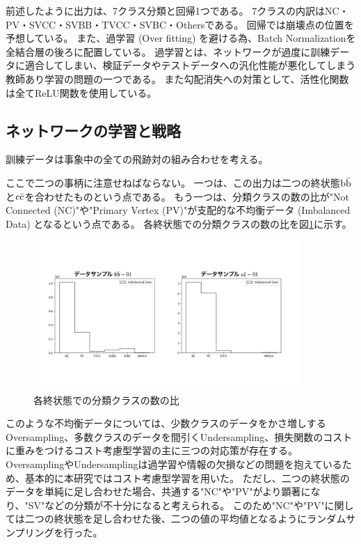 前述したように出力は、7クラス分類と回帰1つである。
7クラスの内訳はNC・PV・SVCC・SVBB・TVCC・SVBC・Othersである。
回帰では崩壊点の位置を予想している。
また、過学習 (Over fitting) を避ける為、Batch Normalization\cite{BatchNormalizationpaper}を全結合層の後ろに配置している。
過学習とは、ネットワークが過度に訓練データに適合してしまい、検証データやテストデータへの汎化性能が悪化してしまう教師あり学習の問題の一つである。
また勾配消失への対策として、活性化関数は全てReLU関数を使用している。


\subsection{ネットワークの学習と戦略} \label{Net:PM:TrainingandStrategyofPM}

訓練データは事象中の全ての飛跡対の組み合わせを考える。

ここで二つの事柄に注意せねばならない。
一つは、この出力は二つの終状態$\rm b\bar{b}$と$\rm c\bar{c}$を合わせたものという点である。
もう一つは、分類クラスの数の比が"Not Connected (NC)"や"Primary Vertex (PV)"が支配的な不均衡データ (Imbalanced Data) となるという点である。
各終状態での分類クラスの数の比を図\ref{3-3-2-1ImbalancedData}に示す。

\begin{figure}[htbp]
 \centering
 \includegraphics[trim = 100 200 100 150, width=0.9\textwidth, clip]{Figure/3Networks/3-3-2-1ImbalancedData.png}
 \caption{各終状態での分類クラスの数の比}
 \label{3-3-2-1ImbalancedData}
\end{figure}

このような不均衡データについては、少数クラスのデータをかさ増しするOversampling、多数クラスのデータを間引くUndersampling、損失関数のコストに重みをつけるコスト考慮型学習の主に三つの対応策が存在する。
OversamplingやUndersamplingは過学習や情報の欠損などの問題を抱えているため、基本的に本研究ではコスト考慮型学習を用いた。
ただし、二つの終状態のデータを単純に足し合わせた場合、共通する"NC"や"PV"がより顕著になり、"SV"などの分類が不十分になると考えられる。
このため"NC"や"PV"に関しては二つの終状態を足し合わせた後、二つの値の平均値となるようにランダムサンプリングを行った。

